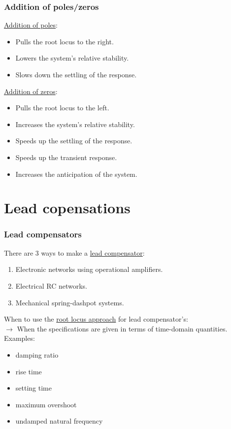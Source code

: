 \begin{frame}
	\frametitle{Addition of poles/zeros}
	\underline{Addition of poles}:\\
	\begin{itemize}
		\item Pulls the root locus to the right.
		\item Lowers the system's relative stability.
		\item Slows down the settling of the response.
	\end{itemize}
	\vspace{3mm}
	
	\underline{Addition of zeros}:
	\begin{itemize}
		\item Pulls the root locus to the left.
		\item Increases the system's relative stability.
		\item Speeds up the settling of the response.
		\item Speeds up the transient response.
		\item Increases the anticipation of the system. 
	\end{itemize}
\end{frame}

\section{Lead copensations}

\begin{frame}
	\frametitle{Lead compensators}
		There are 3 ways to make a \underline{lead compensator}:
		\begin{enumerate}
			\item Electronic networks using operational amplifiers.
			\item Electrical RC networks.
			\item Mechanical spring-dashpot systems.
		\end{enumerate}
		\vspace{3mm}
		
		When to use the \underline{root locus approach} for lead compensator's:\\
		$\rightarrow$ When the specifications are given in terms of time-domain quantities. Examples:
		\begin{itemize}
			\item damping ratio
			\item rise time
			\item setting time
			\item maximum overshoot
			\item undamped natural frequency
		\end{itemize}
\end{frame}


